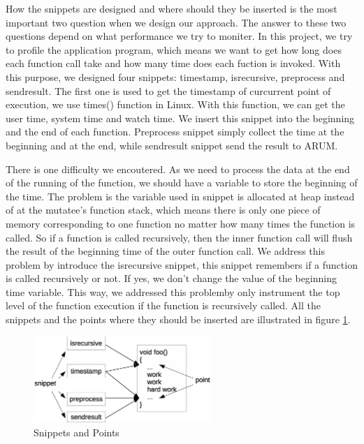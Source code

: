 \documentclass[11pt,letterpaper,oneside]{article}
\begin{document}
How the snippets are designed and where should they be inserted is the most important two question when we design our approach. The answer to these two questions depend on what performance we try to moniter. In this project, we try to profile the application program, which means we want to get how long does each function call take and how many time does each fuction is invoked. With this purpose, we designed four snippets: timestamp, isrecursive, preprocess and sendresult. The first one is used to get the timestamp of curcurrent point of execution, we use times() function in Linux. With this function, we can get the user time, system time and watch time. We insert this snippet into the beginning and the end of each function. Preprocess snippet simply collect the time at the beginning and at the end, while sendresult snippet send the result to ARUM.

There is one difficulty we encoutered. As we need to process the data at the end of the running of the function, we should have a variable to store the beginning of the time. The problem is the variable used in snippet is allocated at heap instead of at the mutatee's function stack, which means there is only one piece of memory corresponding to one function no matter how many times the function is called. So if a function is called recursively, then the inner function call will flush the result of the beginning time of the outer function call. We address this problem by introduce the isrecursive snippet, this snippet remembers if a function is called recursively or not. If yes, we don't change the value of the beginning time variable. This way, we addressed this problemby only instrument the top level of the function execution if the function is recursively called. All the snippets and the points where they should be inserted are illustrated in figure \ref{fig:snippet}.

\begin{figure}
\begin{center}
\includegraphics[width=0.6\textwidth]{snippet.eps}
\caption{Snippets and Points}
\label{fig:snippet}
\end{center}
\end{figure}
\end{document}
